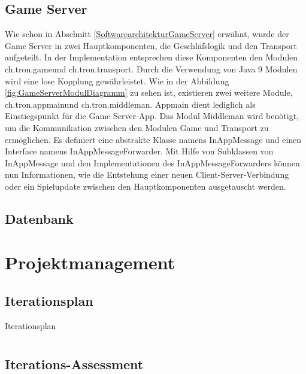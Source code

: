 \documentclass[11pt,ngerman]{article}
\begin{document}
    \subsection{\Gls{Game Server}}
    Wie schon in Abschnitt \ref{SoftwarearchitekturGameServer} erwähnt, wurde der \Gls{Game Server} in zwei Hauptkomponenten, die Geschläfslogik und den Transport aufgeteilt. In der Implementation entsprechen diese Komponenten den Modulen \dq ch.tron.game\dq und \dq ch.tron.transport\dq. Durch die Verwendung von Java 9 Modulen wird eine lose Kopplung gewährleistet. Wie in der Abbildung \ref{fig:GameServerModulDiagramm} zu sehen ist, existieren zwei weitere Module, \dq ch.tron.appmain\dq und \dq ch.tron.middleman\dq. Appmain dient lediglich als Einstiegspunkt für die \Gls{Game Server}-App. Das Modul Middleman wird benötigt, um die Kommunikation zwischen den Modulen Game und Transport zu ermöglichen. Es definiert eine abstrakte Klasse namens InAppMessage und einen Interface namens InAppMessageForwarder. Mit Hilfe von Subklassen von InAppMessage und den Implementationen des InAppMessageForwarders können nun Informationen, wie die Entstehung einer neuen Client-Server-Verbindung oder ein Spielupdate zwischen den Hauptkomponenten ausgetauscht werden.

    \subsection{Datenbank}

    \section{Projektmanagement}

    \subsection{Iterationsplan}

    \begin{table}[H]
        \caption{Iterationsplan}
        \begin{tabularx}{\textwidth}{X}
            \toprule
            
            \bottomrule
        \end{tabularx}
        \label{tab:Iterationsplan}
    \end{table}

    \subsection{Iterations-Assessment}
\end{document}
